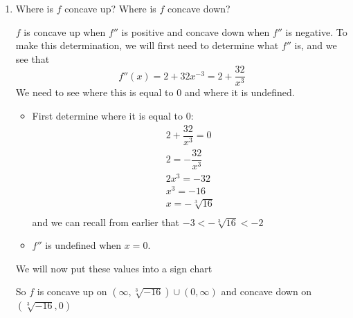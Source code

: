 \documentclass{article}
\begin{document}
\begin{enumerate}
\begin{enumerate}
  \item
    \begin{problem}[\vfill\newpage]
      Where is $f$ concave up? Where is $f$ concave down? 
    \end{problem}

    \begin{solution}
        $f$ is concave up when $f''$ is positive and concave down when $f''$ is negative. To make this determination, we will first need to determine what $f''$ is, and we see that 
        $$f''(x) = 2 + 32x^{-3} = 2 + \dfrac{32}{x^3}$$
        We need to see where this is equal to 0 and where it is undefined.
        \begin{itemize}
            \item First determine where it is equal to 0:
            \begin{align*}
                2+\dfrac{32}{x^3} = 0 \\
                2 = -\dfrac{32}{x^3} \\
                2x^3 = -32 \\
                x^3  = -16 \\
                x = - \sqrt[3]{16}\\
            \end{align*}
            and we can recall from earlier that $-3< -\sqrt[3]{16}<-2$
            \item $f''$ is undefined when $x = 0$. 
        \end{itemize}
        We will now put these values into a sign chart 
            \begin{center}
      \end{center}
      So $f$ is concave up on $(\infty, \sqrt[3]{-16}) \cup (0, \infty)$ and concave down on $(\sqrt[3]{-16}, 0 )$
        

\end{solution}
\end{enumerate}
\end{enumerate}
\end{document}
